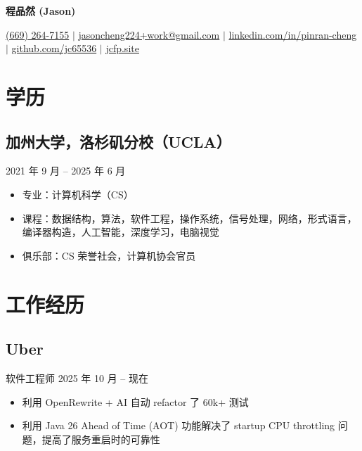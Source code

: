 \documentclass{article}
\begin{document}

\begin{center}
  \setlength{\parskip}{6pt}

  \Large \textbf{程品然 (Jason)}

  \normalsize
  \href{tel:+1-669-264-7155}{(669) 264-7155} $|$
  \href{mailto:jasoncheng224+work@gmail.com}{jasoncheng224+work@gmail.com} $|$
  \href{https://www.linkedin.com/in/pinran-cheng/}{linkedin.com/in/pinran-cheng} $|$
  \href{https://github.com/jc65536}{github.com/jc65536} $|$
  \href{https://jcfp.site/}{jcfp.site}
\end{center}

\section*{学历}

\subsection*{加州大学，洛杉矶分校（UCLA）}
\hfill 2021 年 9 月 -- 2025 年 6 月
\begin{itemize}
  \item 专业：计算机科学（CS）

  \item 课程：数据结构，算法，软件工程，操作系统，信号处理，网络，形式语言，编译器构造，人工智能，深度学习，电脑视觉

  \item 俱乐部：CS 荣誉社会，计算机协会官员
\end{itemize}

\section*{工作经历}

\subsection*{Uber} 软件工程师
\hfill 2025 年 10 月 -- 现在
\begin{itemize}
  \item 利用 OpenRewrite + AI 自动 refactor 了 60k+ 测试
  \item 利用 Java 26 Ahead of Time (AOT) 功能解决了 startup CPU throttling 问题，提高了服务重启时的可靠性

\end{itemize}
\end{document}
